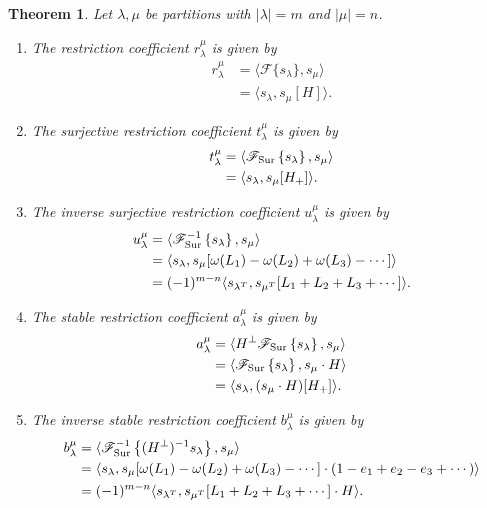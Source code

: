 \documentclass[11pt]{article}
\newtheorem{theorem}[theo]{Theorem}
\theoremstyle{definition}
\numberwithin{equation}{section}
\newcommand{\Sur}{\mathchoice{\operatorname{Sur}}{\operatorname{Sur}}{\mathrm{Sur}}{\mathrm{Sur}}}
\newcommand{\F}[1]{\mathscr{F}\{#1\}}
\newcommand{\FSur}[1]{\mathscr{F}_{\Sur}\left\{#1\right\}}
\newcommand{\FSurInv}[1]{\mathscr{F}_{\Sur}^{-1}\left\{#1\right\}}
\begin{document}
\begin{theorem}\label{theorem:summary}
    Let $\lambda, \mu$ be partitions with $|\lambda| = m$ and $|\mu| = n$.
    \begin{enumerate}[label=(\alph*)]
        \item The restriction coefficient $r_\lambda^\mu$ is given by 
        \begin{align*}
            r_{\lambda}^\mu
            &= \langle \F{s_\lambda}, s_\mu\rangle \\
            &= \langle s_\lambda, s_\mu[H] \rangle.
        \end{align*}
        \item The surjective restriction coefficient $t_\lambda^\mu$ is given by 
        \begin{align*}
            t_{\lambda}^\mu &= \langle \FSur{s_\lambda}, s_\mu\rangle\\
            &= \langle s_\lambda, s_\mu[H_+] \rangle.
        \end{align*}
        \item The inverse surjective restriction coefficient $u_\lambda^\mu$ is given by
        \begin{align*}
            u_\lambda^\mu &= \langle \FSurInv{s_\lambda}, s_\mu \rangle \\
            &= \langle s_\lambda, s_\mu[\omega(L_1) - \omega(L_2) + \omega(L_3) - \cdots] \rangle \\
            &= (-1)^{m - n}\langle s_{\lambda^T}, s_{\mu^T}[L_1 + L_2 + L_3 + \cdots] \rangle.
        \end{align*}
        \item The stable restriction coefficient $a_\lambda^\mu$ is given by
        \begin{align*}
            a_\lambda^\mu &= \langle H^\perp \FSur{s_\lambda}, s_\mu\rangle \\
            &= \langle \FSur{s_\lambda}, s_\mu \cdot H\rangle \\
            &= \langle s_\lambda, (s_\mu \cdot H)[H_+]\rangle.
        \end{align*}
        \item The inverse stable restriction coefficient $b_\lambda^\mu$ is given by
        \begin{align*}
            b_\lambda^\mu &= \langle \FSurInv{(H^\perp)^{-1} s_\lambda}, s_\mu \rangle \\
            &= \langle s_\lambda, s_\mu[\omega(L_1) - \omega(L_2) + \omega(L_3) - \cdots] \cdot (1 - e_1 + e_2 - e_3 + \cdots)\rangle \\
            &= (-1)^{m - n} \langle s_{\lambda^T}, s_{\mu^T}[L_1 + L_2 + L_3 + \cdots] \cdot H \rangle.
        \end{align*}
    \end{enumerate}
\end{theorem}
\end{document}
